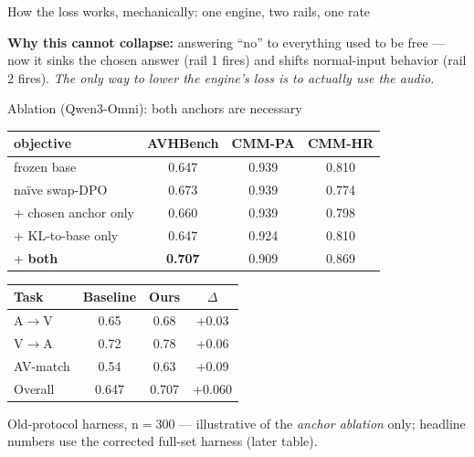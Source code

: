 \documentclass[aspectratio=169,11pt]{beamer}
\begin{document}
\begin{frame}{How the loss works, mechanically: one engine, two rails, one rate}
{}
\vspace{0.4em}
\par
{\small\textbf{Why this cannot collapse:} answering ``no'' to everything used to be free --- now it
sinks the chosen answer (\textcolor{red!70!black}{rail 1 fires}) and shifts normal-input behavior
(\textcolor{blue!70!black}{rail 2 fires}). \emph{The only way to lower the
\textcolor{green!50!black}{engine}'s loss is to actually use the audio.}}
\end{frame}

\begin{frame}{Ablation (Qwen3-Omni): both anchors are necessary}
\centering
\begin{tabular}{lccc}
\toprule
objective & AVHBench & CMM-PA & CMM-HR \\
\midrule
frozen base            & 0.647 & 0.939 & 0.810 \\
na\"ive swap-DPO       & 0.673 & 0.939 & 0.774 \\
\;+ chosen anchor only & 0.660 & 0.939 & 0.798 \\
\;+ KL-to-base only    & 0.647 & 0.924 & 0.810 \\
\;+ \textbf{both}      & \textbf{0.707} & 0.909 & 0.869 \\
\bottomrule
\end{tabular}
\vfill
\begin{tabular}{lccc}
\hline
Task & Baseline & Ours & $\Delta$ \\
\hline
A$\to$V      & 0.65  & 0.68  & +0.03 \\
V$\to$A      & 0.72  & 0.78  & +0.06 \\
AV-match     & 0.54  & 0.63  & +0.09 \\
\hline
Overall      & 0.647 & 0.707 & +0.060 \\
\hline
\end{tabular}
\par\vspace{0.3em}
{\scriptsize Old-protocol harness, n$=$300 --- illustrative of the \emph{anchor ablation} only;
headline numbers use the corrected full-set harness (later table).}
\end{frame}
\end{document}
